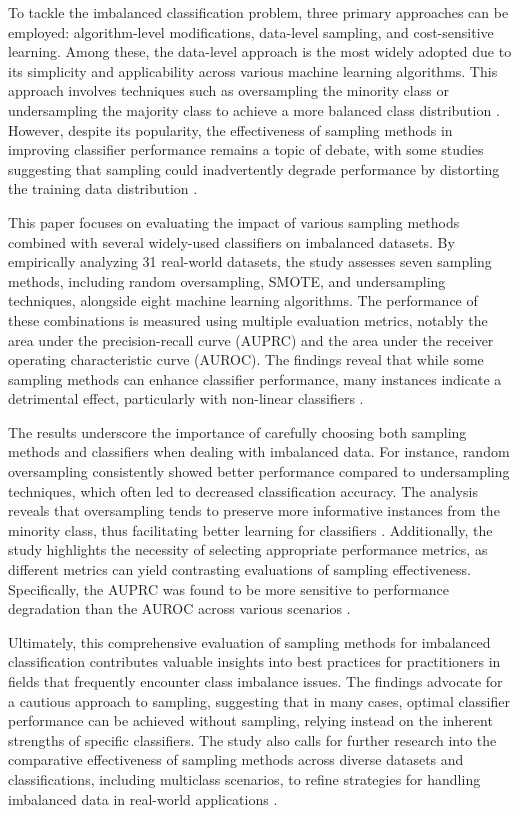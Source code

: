 \documentclass[runningheads]{llncs}
\begin{document}
To tackle the imbalanced classification problem, three primary approaches can be employed: algorithm-level modifications, data-level sampling, and cost-sensitive learning. Among these, the data-level approach is the most widely adopted due to its simplicity and applicability across various machine learning algorithms. This approach involves techniques such as oversampling the minority class or undersampling the majority class to achieve a more balanced class distribution \cite{Misuk_2022}. However, despite its popularity, the effectiveness of sampling methods in improving classifier performance remains a topic of debate, with some studies suggesting that sampling could inadvertently degrade performance by distorting the training data distribution \cite{Misuk_2022}.

This paper focuses on evaluating the impact of various sampling methods combined with several widely-used classifiers on imbalanced datasets. By empirically analyzing 31 real-world datasets, the study assesses seven sampling methods, including random oversampling, SMOTE, and undersampling techniques, alongside eight machine learning algorithms. The performance of these combinations is measured using multiple evaluation metrics, notably the area under the precision-recall curve (AUPRC) and the area under the receiver operating characteristic curve (AUROC). The findings reveal that while some sampling methods can enhance classifier performance, many instances indicate a detrimental effect, particularly with non-linear classifiers \cite{Misuk_2022}.

The results underscore the importance of carefully choosing both sampling methods and classifiers when dealing with imbalanced data. For instance, random oversampling consistently showed better performance compared to undersampling techniques, which often led to decreased classification accuracy. The analysis reveals that oversampling tends to preserve more informative instances from the minority class, thus facilitating better learning for classifiers \cite{Misuk_2022}. Additionally, the study highlights the necessity of selecting appropriate performance metrics, as different metrics can yield contrasting evaluations of sampling effectiveness. Specifically, the AUPRC was found to be more sensitive to performance degradation than the AUROC across various scenarios \cite{Misuk_2022}.

Ultimately, this comprehensive evaluation of sampling methods for imbalanced classification contributes valuable insights into best practices for practitioners in fields that frequently encounter class imbalance issues. The findings advocate for a cautious approach to sampling, suggesting that in many cases, optimal classifier performance can be achieved without sampling, relying instead on the inherent strengths of specific classifiers. The study also calls for further research into the comparative effectiveness of sampling methods across diverse datasets and classifications, including multiclass scenarios, to refine strategies for handling imbalanced data in real-world applications \cite{Misuk_2022}.
\end{document}

